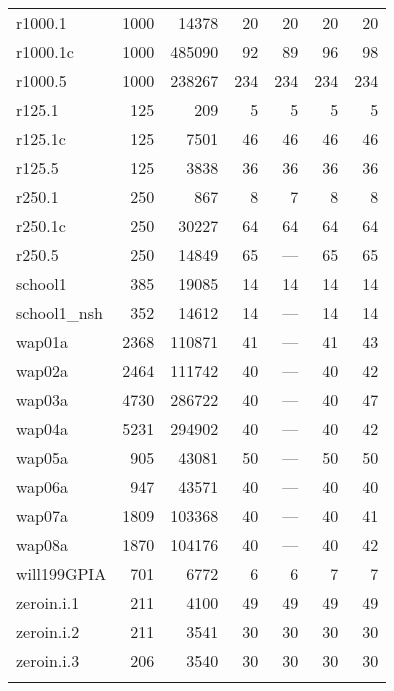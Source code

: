 \begin{longtable}{lrrrrrr}
  r1000.1 & 1000 & 14378 & 20 & 20 & 20 & 20 \\ 
  r1000.1c & 1000 & 485090 & 92 & 89 & 96 & 98 \\ 
  r1000.5 & 1000 & 238267 & 234 & 234 & 234 & 234 \\ 
  r125.1 & 125 & 209 & 5 & 5 & 5 & 5 \\ 
  r125.1c & 125 & 7501 & 46 & 46 & 46 & 46 \\ 
  r125.5 & 125 & 3838 & 36 & 36 & 36 & 36 \\ 
  r250.1 & 250 & 867 & 8 & 7 & 8 & 8 \\ 
  r250.1c & 250 & 30227 & 64 & 64 & 64 & 64 \\ 
  r250.5 & 250 & 14849 & 65 & --- & 65 & 65 \\ 
  school1 & 385 & 19085 & 14 & 14 & 14 & 14 \\ 
  school1\_nsh & 352 & 14612 & 14 & --- & 14 & 14 \\ 
  wap01a & 2368 & 110871 & 41 & --- & 41 & 43 \\ 
  wap02a & 2464 & 111742 & 40 & --- & 40 & 42 \\ 
  wap03a & 4730 & 286722 & 40 & --- & 40 & 47 \\ 
  wap04a & 5231 & 294902 & 40 & --- & 40 & 42 \\ 
  wap05a & 905 & 43081 & 50 & --- & 50 & 50 \\ 
  wap06a & 947 & 43571 & 40 & --- & 40 & 40 \\ 
  wap07a & 1809 & 103368 & 40 & --- & 40 & 41 \\ 
  wap08a & 1870 & 104176 & 40 & --- & 40 & 42 \\ 
  will199GPIA & 701 & 6772 & 6 & 6 & 7 & 7 \\ 
  zeroin.i.1 & 211 & 4100 & 49 & 49 & 49 & 49 \\ 
  zeroin.i.2 & 211 & 3541 & 30 & 30 & 30 & 30 \\ 
  zeroin.i.3 & 206 & 3540 & 30 & 30 & 30 & 30 \\ 
   \bottomrule
\label{tab:norefs}
\end{longtable}
\endgroup

